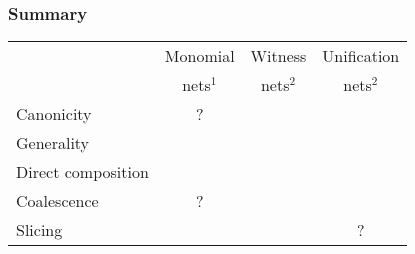 \documentclass[xcolor=dvipsnames,9pt]{beamer}
\def\citecolor{\color{ForestGreen}}
\def\headcolor{\color{myblue}}
\def\mytitle#1{\frametitle{\headcolor #1}}
\def\citefootnotetext#1{\footnotetext{\citecolor #1}}
\newcommand\+{+}
\renewcommand\*{\times}
\newcommand\xmark{{\color{darkred}\ding{55}}}
\newcommand\vmark{{\color{darkgreen}\ding{51}}}
\def\headcolor{\color{myblue}}
\begin{document}
\begin{frame}
  \mytitle{Summary}

  \begin{center}
    \begin{tabular}{@{}l@{}ccc@{}}
      &	Monomial & Witness & Unification
      \\ & nets$^1$ & nets$^2$ & nets$^2$
      \\\hline
      Canonicity          &    ?   & \vmark & \vmark
      \\ Generality          & \xmark & \xmark & \vmark
      \\ Direct composition  & \xmark & \vmark & \vmark
      \\ Coalescence         &    ?   & \vmark & \vmark
      \\ Slicing             & \vmark & \vmark &   ?
    \end{tabular}  
  \end{center}
  \vfill
  \pause
  \hfill{}
  \citefootnotetext{$^1$[Girard 1987, 1996]\quad $^2$[Inria RR-9201]\\}
\end{frame}




\end{document}
